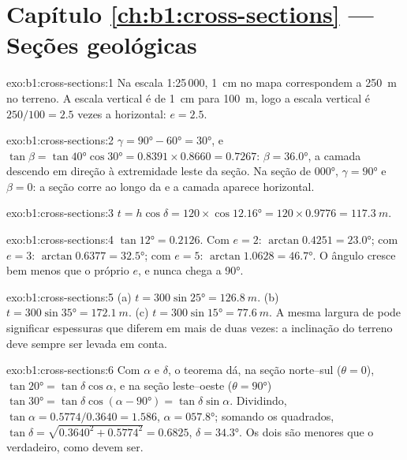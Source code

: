 \section*{Capítulo \ref{ch:b1:cross-sections} --- Seções geológicas}

\begin{solution}{exo:b1:cross-sections:1}
Na escala 1:25\,000, \qty{1}{cm} no mapa correspondem a \qty{250}{m} no terreno. A escala vertical é de \qty{1}{cm} para \qty{100}{m}, logo a escala vertical é
$250/100 = 2.5$ vezes a horizontal: $e = 2.5$.
\end{solution}

\begin{solution}{exo:b1:cross-sections:2}
$\gamma = \ang{90} - \ang{60} = \ang{30}$, e $\tan\beta = \tan\ang{40}
\cos\ang{30} = 0.8391\times0.8660 = 0.7267$: $\beta = \ang{36.0}$, a camada
descendo em direção à extremidade leste da seção. Na seção de 
\ang{000}, $\gamma = \ang{90}$ e $\beta = 0$: a seção corre ao longo da  e a camada aparece horizontal.
\end{solution}

\begin{solution}{exo:b1:cross-sections:3}
$t = h\cos\delta = 120\times\cos\ang{12.16} = 120\times0.9776 =
\qty{117.3}{m}$.
\end{solution}

\begin{solution}{exo:b1:cross-sections:4}
$\tan\ang{12} = 0.2126$. Com $e = 2$: $\arctan 0.4251 = \ang{23.0}$; com
$e = 3$: $\arctan 0.6377 = \ang{32.5}$; com $e = 5$: $\arctan 1.0628 =
\ang{46.7}$. O ângulo cresce bem menos que o próprio $e$, e nunca chega a
\ang{90}.
\end{solution}

\begin{solution}{exo:b1:cross-sections:5}
(a) $t = 300\sin\ang{25} = \qty{126.8}{m}$. (b) $t = 300\sin\ang{35} =
\qty{172.1}{m}$. (c) $t = 300\sin\ang{15} = \qty{77.6}{m}$. A mesma largura de  pode significar espessuras que diferem em mais de duas vezes: a inclinação do terreno deve sempre ser levada em conta.
\end{solution}

\begin{solution}{exo:b1:cross-sections:6}
Com  $\alpha$ e  $\delta$, o teorema dá, na seção norte--sul ($\theta = 0$), $\tan\ang{20} = \tan\delta\cos\alpha$,
e na seção leste--oeste ($\theta = \ang{90}$) $\tan\ang{30} =
\tan\delta\cos(\alpha - \ang{90}) = \tan\delta\sin\alpha$. Dividindo,
$\tan\alpha = 0.5774/0.3640 = 1.586$, $\alpha = \ang{057.8}$; somando os
quadrados, $\tan\delta = \sqrt{0.3640^2 + 0.5774^2} = 0.6825$, $\delta =
\ang{34.3}$. Os dois  são menores que o  verdadeiro, como devem ser.
\end{solution}

